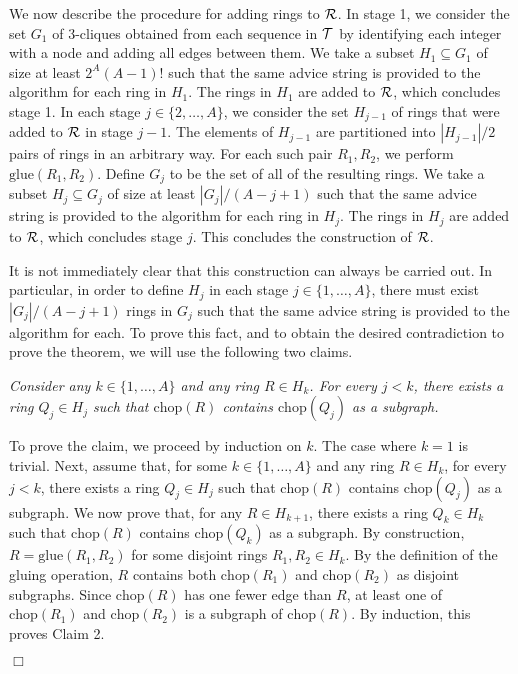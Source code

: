 \documentclass[11pt]{article}
\newcommand{\qed}{\hfill $\Box$ \bigbreak}
\newenvironment{proof}{\noindent {\bf Proof.}}{\qed}
\newcommand{\chop}[1]{\ensuremath{\mathrm{chop}(#1)}}
\newcommand{\glue}[2]{\ensuremath{\mathrm{glue}(#1,#2)}}
\begin{document}
\begin{proof}
We now describe the procedure for adding rings to ${\cal R}$. In stage 1, we consider the set $G_1$ of 3-cliques obtained from each sequence in ${\cal T}$ by identifying each integer with a node and adding all edges between them. We take a subset $H_1 \subseteq G_1$ of size at least $2^{A}(A-1)!$ such that the same advice string is provided to the algorithm for each ring in $H_1$. The rings in $H_1$ are added to ${\cal R}$, which concludes stage 1. In each stage $j \in \{2,\ldots,A\}$, we consider the set $H_{j-1}$ of rings that were added to ${\cal R}$ in stage $j-1$. The elements of $H_{j-1}$ are partitioned into $|H_{j-1}|/2$ pairs of rings in an arbitrary way. For each such pair $R_1,R_2$, we perform $\glue{R_1}{R_2}$. Define $G_j$ to be the set of all of the resulting rings.   We take a subset $H_j \subseteq G_j$ of size at least $|G_j|/(A-j+1)$ such that the same advice string is provided to the algorithm for each ring in $H_j$. The rings in $H_j$ are added to ${\cal R}$, which concludes stage $j$. This concludes the construction of ${\cal R}$.

It is not immediately clear that this construction can always be carried out. In particular, in order to define $H_j$ in each stage $j \in \{1,\ldots,A\}$,
there must exist $|G_j|/(A-j+1)$ rings in $G_j$ such that the same advice string is provided to the algorithm for each. To prove this fact, and to obtain the desired contradiction to prove the theorem, we will use the following two claims. 

\vspace{3mm} 
\textit{Consider any $k \in \{1,\ldots,A\}$ and any ring $R \in H_k$. For every $j < k$, there exists a ring $Q_j \in H_j$ such that $\chop{R}$ contains $\chop{Q_j}$ as a subgraph.}
\vspace{3mm}

To prove the claim, we proceed by induction on $k$. The case where $k=1$ is trivial. Next, assume that, for some $k \in \{1,\ldots,A\}$ and any ring $R \in H_k$, for every $j < k$, there exists a ring $Q_j \in H_j$ such that $\chop{R}$ contains $\chop{Q_j}$ as a subgraph. We now prove that, for any $R \in H_{k+1}$, there exists a ring $Q_k \in H_k$ such that $\chop{R}$ contains $\chop{Q_k}$ as a subgraph. By construction, $R = \glue{R_1}{R_2}$ for some disjoint rings $R_1,R_2 \in H_k$. By the definition of the gluing operation, $R$ contains both $\chop{R_1}$ and $\chop{R_2}$ as disjoint subgraphs. Since $\chop{R}$ has one fewer edge than $R$, at least one of  $\chop{R_1}$ and $\chop{R_2}$ is a subgraph of $\chop{R}$. By induction, this proves Claim 2.


\end{proof}
\end{document}
